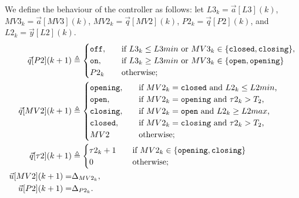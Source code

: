 {We define the behaviour of the controller as follows: let $L3_k=\vec{a}[L3](k)$, $MV3_k=\vec{a}[MV3](k)$, $MV2_k=\vec{q}[MV2](k)$, $P2_k=\vec{q}[P2](k)$, and $L2_k=\vec{y}[L2](k)$.
\begin{align}
\vec{q}[P2](k+1)&\triangleq
    \begin{cases}
      \texttt{off},&\quad \text{if $L3_k\leq L3min$ or $MV3_k\in \set{\texttt{closed},\texttt{closing}}$},\\
      \texttt{on},&\quad \text{if $L3_k \geq L3min$ or $MV3_k\in \set{\texttt{open},\texttt{opening}}$}\\
      P2_k&\quad \text{otherwise;}
    \end{cases}\\
\vec{q}[MV2](k+1)&\triangleq
  \begin{cases}
    \texttt{opening},&\quad \text{if $MV2_k=\texttt{closed}$ and $L2_k\leq L2min$,}\\
    \texttt{open},&\quad \text{if $MV2_k=\texttt{opening}$ and $\tau2_k>T_2$,}\\
    \texttt{closing},&\quad \text{if $MV2_k=\texttt{open}$ and $L2_k\geq L2max$,}\\
    \texttt{closed},&\quad \text{if $MV2_k=\texttt{closing}$ and $\tau2_k>T_2$,}\\
    MV2&\quad \text{otherwise;}    
  \end{cases}\\
\vec{q}[\tau2](k+1)&\triangleq
\begin{cases}
  \tau2_k+1 &\quad \text{if $MV2_k\in \set{\texttt{opening},\texttt{closing}}$}\\
  0&\quad \text{otherwise;}    
\end{cases}\\
\vec{u}[MV2](k+1)=&\const_{MV2_k},\\%
\vec{u}[P2](k+1)=&\const_{P2_k}.%
\end{align}
}
